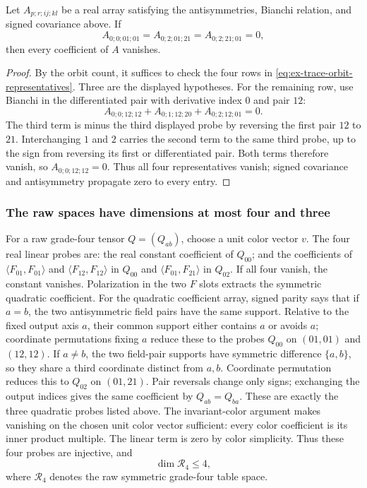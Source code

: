 \begin{lemma}
\label{lem:ex-trace-vector-probes}
Let $A_{p;r;ij;kl}$ be a real array satisfying the antisymmetries,
Bianchi relation, and signed covariance above. If
\[
 A_{0;0;01;01}=A_{0;2;01;21}=A_{0;2;21;01}=0,
\]
then every coefficient of $A$ vanishes.
\end{lemma}
\begin{proof}
By the orbit count, it suffices to check the four rows in
\eqref{eq:ex-trace-orbit-representatives}. Three are the displayed
hypotheses. For the remaining row, use Bianchi in the differentiated pair
with derivative index $0$ and pair $12$:
\[
 A_{0;0;12;12}+A_{0;1;12;20}+A_{0;2;12;01}=0.
\]
The third term is minus the third displayed probe by reversing the first
pair $12$ to $21$. Interchanging $1$ and $2$ carries the second term to
the same third probe, up to the sign from reversing its first or
differentiated pair. Both terms therefore vanish, so $A_{0;0;12;12}=0$.
Thus all four representatives vanish; signed
covariance and antisymmetry propagate zero to every entry.
\end{proof}

\subsubsection{The raw spaces have dimensions at most four and three}

For a raw grade-four tensor $Q=(Q_{ab})$, choose a unit color vector $v$.
The four real linear probes are: the real constant coefficient of $Q_{00}$;
and the coefficients of $\langle F_{01},F_{01}\rangle$ and
$\langle F_{12},F_{12}\rangle$ in $Q_{00}$ and
$\langle F_{01},F_{21}\rangle$ in $Q_{02}$. If all four vanish, the
constant vanishes. Polarization in the two $F$ slots extracts the symmetric
quadratic coefficient. For the quadratic coefficient array, signed parity says that if $a=b$,
the two antisymmetric field pairs have the same support. Relative to the
fixed output axis $a$, their common support either contains $a$ or avoids
$a$; coordinate permutations fixing $a$ reduce these to the probes
$Q_{00}$ on $(01,01)$ and $(12,12)$. If $a\ne b$, the two field-pair
supports have symmetric difference $\{a,b\}$, so they share a third
coordinate distinct from $a,b$. Coordinate permutation reduces this to
$Q_{02}$ on $(01,21)$. Pair reversals change only signs; exchanging the
output indices gives the same coefficient by $Q_{ab}=Q_{ba}$. These are
exactly the three quadratic probes listed above.
The invariant-color argument makes vanishing on the chosen unit color vector
sufficient: every color coefficient is its inner product multiple. The
linear term is zero by color simplicity. Thus these four probes are
injective, and
\[
 \dim \mathcal R_4\le4,
\]
where $\mathcal R_4$ denotes the raw symmetric grade-four table space.

